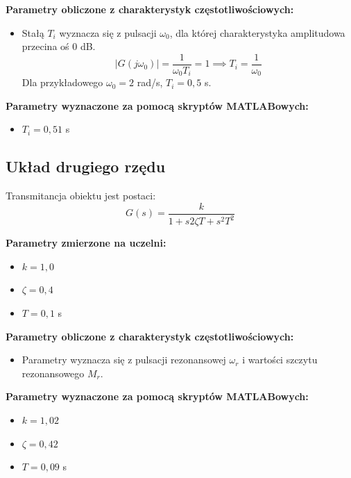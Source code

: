 \documentclass[12pt,a4paper]{article}
\begin{document}
	\noindent \textbf{Parametry obliczone z charakterystyk częstotliwościowych:}
	\begin{itemize}
		\item Stałą $T_i$ wyznacza się z pulsacji $\omega_0$, dla której charakterystyka amplitudowa przecina oś 0 dB.
		$$|G(j\omega_0)| = \frac{1}{\omega_0 T_i} = 1 \implies T_i = \frac{1}{\omega_0}$$
		Dla przykładowego $\omega_0 = 2$ rad/s, $T_i=0,5$ s.
	\end{itemize}
	
	\noindent \textbf{Parametry wyznaczone za pomocą skryptów MATLABowych:}
	\begin{itemize}
		\item $T_i = 0{,}51$ s %
	\end{itemize}
	
	\subsection{Układ drugiego rzędu}
	Transmitancja obiektu jest postaci:
	\begin{equation}
		G(s) = \frac{k}{1+s 2\zeta T + s^2 T^2}
	\end{equation}
	
	\noindent \textbf{Parametry zmierzone na uczelni:}
	\begin{itemize}
		\item $k = 1{,}0$ %
		\item $\zeta = 0{,}4$ %
		\item $T = 0{,}1$ s %
	\end{itemize}
	
	\noindent \textbf{Parametry obliczone z charakterystyk częstotliwościowych:}
	\begin{itemize}
		\item Parametry wyznacza się z pulsacji rezonansowej $\omega_r$ i wartości szczytu rezonansowego $M_r$.
	\end{itemize}
	
	\noindent \textbf{Parametry wyznaczone za pomocą skryptów MATLABowych:}
	\begin{itemize}
		\item $k = 1{,}02$ %
		\item $\zeta = 0{,}42$ %
		\item $T = 0{,}09$ s %
	\end{itemize}
	
\end{document}
